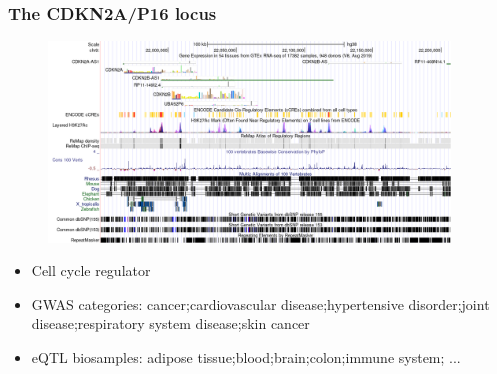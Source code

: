 \documentclass{beamer}
\begin{document}
    \begin{frame}
        \frametitle{The CDKN2A/P16 locus}

        \begin{figure}[!]
            \includegraphics[width=0.95\textwidth]{fig/cdk2na}
        \end{figure}

        \begin{itemize}
            \item Cell cycle regulator
            \item GWAS categories: cancer;cardiovascular disease;hypertensive disorder;joint disease;respiratory system disease;skin cancer
            \item eQTL biosamples: adipose tissue;blood;brain;colon;immune system; ...
        \end{itemize}

    \end{frame}
\end{document}
